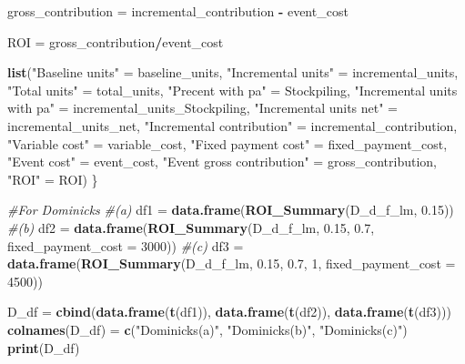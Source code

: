 \documentclass[]{article}
\newenvironment{Shaded}{\begin{snugshade}}{\end{snugshade}}
\newcommand{\CommentTok}[1]{\textcolor[rgb]{0.56,0.35,0.01}{\textit{#1}}}
\newcommand{\DataTypeTok}[1]{\textcolor[rgb]{0.13,0.29,0.53}{#1}}
\newcommand{\DecValTok}[1]{\textcolor[rgb]{0.00,0.00,0.81}{#1}}
\newcommand{\FloatTok}[1]{\textcolor[rgb]{0.00,0.00,0.81}{#1}}
\newcommand{\KeywordTok}[1]{\textcolor[rgb]{0.13,0.29,0.53}{\textbf{#1}}}
\newcommand{\NormalTok}[1]{#1}
\newcommand{\OperatorTok}[1]{\textcolor[rgb]{0.81,0.36,0.00}{\textbf{#1}}}
\newcommand{\StringTok}[1]{\textcolor[rgb]{0.31,0.60,0.02}{#1}}
\begin{document}
\begin{Shaded}
\begin{Highlighting}[]
\NormalTok{gross_contribution =}\StringTok{ }\NormalTok{incremental_contribution }\OperatorTok{-}\StringTok{ }\NormalTok{event_cost}

\NormalTok{ROI =}\StringTok{ }\NormalTok{gross_contribution}\OperatorTok{/}\NormalTok{event_cost}

\KeywordTok{list}\NormalTok{(}\StringTok{"Baseline units"}\NormalTok{ =}\StringTok{ }\NormalTok{baseline_units,}
     \StringTok{"Incremental units"}\NormalTok{ =}\StringTok{ }\NormalTok{incremental_units,}
     \StringTok{"Total units"}\NormalTok{ =}\StringTok{ }\NormalTok{total_units,}
     \StringTok{"Precent with pa"}\NormalTok{ =}\StringTok{ }\NormalTok{Stockpiling,}
     \StringTok{"Incremental units with pa"}\NormalTok{ =}\StringTok{ }\NormalTok{incremental_units_Stockpiling,}
     \StringTok{"Incremental units net"}\NormalTok{ =}\StringTok{ }\NormalTok{incremental_units_net,}
     \StringTok{"Incremental contribution"}\NormalTok{ =}\StringTok{ }\NormalTok{incremental_contribution,}
     \StringTok{"Variable cost"}\NormalTok{ =}\StringTok{ }\NormalTok{variable_cost,}
     \StringTok{"Fixed payment cost"}\NormalTok{ =}\StringTok{ }\NormalTok{fixed_payment_cost,}
     \StringTok{"Event cost"}\NormalTok{ =}\StringTok{ }\NormalTok{event_cost,}
     \StringTok{"Event gross contribution"}\NormalTok{ =}\StringTok{ }\NormalTok{gross_contribution,}
     \StringTok{"ROI"}\NormalTok{ =}\StringTok{ }\NormalTok{ROI)}
\NormalTok{\}}




\CommentTok{#For Dominicks}
\CommentTok{#(a) }
\NormalTok{df1 =}\StringTok{ }\KeywordTok{data.frame}\NormalTok{(}\KeywordTok{ROI_Summary}\NormalTok{(D_d_f_lm, }\FloatTok{0.15}\NormalTok{))}
\CommentTok{#(b)}
\NormalTok{df2 =}\StringTok{ }\KeywordTok{data.frame}\NormalTok{(}\KeywordTok{ROI_Summary}\NormalTok{(D_d_f_lm, }\FloatTok{0.15}\NormalTok{, }\FloatTok{0.7}\NormalTok{, }\DataTypeTok{fixed_payment_cost =} \DecValTok{3000}\NormalTok{))}
\CommentTok{#(c)}
\NormalTok{df3 =}\StringTok{ }\KeywordTok{data.frame}\NormalTok{(}\KeywordTok{ROI_Summary}\NormalTok{(D_d_f_lm, }\FloatTok{0.15}\NormalTok{, }\FloatTok{0.7}\NormalTok{, }\DecValTok{1}\NormalTok{, }\DataTypeTok{fixed_payment_cost =} \DecValTok{4500}\NormalTok{))}

\NormalTok{D_df =}\StringTok{ }\KeywordTok{cbind}\NormalTok{(}\KeywordTok{data.frame}\NormalTok{(}\KeywordTok{t}\NormalTok{(df1)), }\KeywordTok{data.frame}\NormalTok{(}\KeywordTok{t}\NormalTok{(df2)), }\KeywordTok{data.frame}\NormalTok{(}\KeywordTok{t}\NormalTok{(df3)))}
\KeywordTok{colnames}\NormalTok{(D_df) =}\StringTok{ }\KeywordTok{c}\NormalTok{(}\StringTok{"Dominicks(a)"}\NormalTok{, }\StringTok{"Dominicks(b)"}\NormalTok{, }\StringTok{"Dominicks(c)"}\NormalTok{)}
\KeywordTok{print}\NormalTok{(D_df)}
\end{Highlighting}
\end{Shaded}
\end{document}
